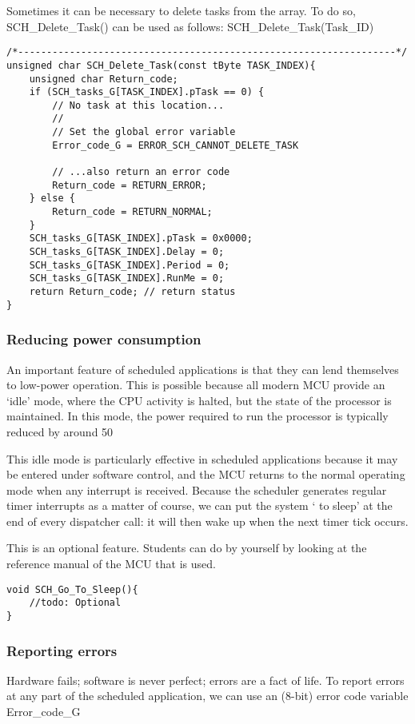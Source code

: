 Sometimes it can be necessary to delete tasks from the array. To do so,
SCH\_Delete\_Task() can be used as follows:
SCH\_Delete\_Task(Task\_ID)

\begin{lstlisting}[basicstyle=\small, caption=An implementation of the scheduler ‘delete task’ function]
/*------------------------------------------------------------------*/
unsigned char SCH_Delete_Task(const tByte TASK_INDEX){
    unsigned char Return_code;
    if (SCH_tasks_G[TASK_INDEX].pTask == 0) {
        // No task at this location...
        //
        // Set the global error variable
        Error_code_G = ERROR_SCH_CANNOT_DELETE_TASK
        
        // ...also return an error code
        Return_code = RETURN_ERROR;
    } else {
        Return_code = RETURN_NORMAL;
    } 
    SCH_tasks_G[TASK_INDEX].pTask = 0x0000;
    SCH_tasks_G[TASK_INDEX].Delay = 0;
    SCH_tasks_G[TASK_INDEX].Period = 0;
    SCH_tasks_G[TASK_INDEX].RunMe = 0;
    return Return_code; // return status
}
\end{lstlisting}
\subsubsection{Reducing power consumption}
An important feature of scheduled applications is that they can lend themselves to
low-power operation. This is possible because all modern MCU provide an ‘idle’ mode, where the CPU activity is halted, but the state of the processor is maintained. In this mode, the power required to run the processor is typically reduced by around 50%

This idle mode is particularly effective in scheduled applications because it may be
entered under software control, and the MCU returns to the normal operating mode when any interrupt is received. Because the scheduler generates regular timer interrupts as a matter of course, we can put the system ‘ to sleep’ at the end of every dispatcher call: it will then wake up when the next timer tick occurs.

This is an optional feature. Students can do by yourself by looking at the reference manual of the MCU that is used. 
\begin{lstlisting}[basicstyle=\small, caption=An implementation of the scheduler ‘go to sleep’ function]
void SCH_Go_To_Sleep(){
    //todo: Optional
}
\end{lstlisting}

\subsubsection{Reporting errors}
Hardware fails; software is never perfect; errors are a fact of life. 
To report errors at any part of the scheduled application, we can use an (8-bit) error
code variable Error\_code\_G

